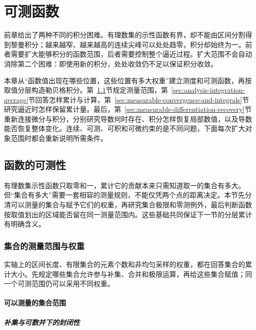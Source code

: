 \chapter{可测函数}
\label{chap:measurable-functions}

前章给出了两种不同的积分困难。有理数集的示性函数有界，却不能由区间分割得到黎曼积分；越来越窄、越来越高的连续尖峰可以处处趋零，积分却始终为一。前者需要扩大能够积分的函数范围，后者需要控制整个逼近过程。扩大范围不会自动消除第二个困难：即使用新的积分，处处收敛仍不足以保证积分收敛。

本章从“函数值出现在哪些位置，这些位置有多大权重”建立测度和可测函数，再按取值分层构造勒贝格积分。第~\ref{sec:analysis-set-structures}节规定测量范围，第~\ref{sec:analysis-integration-average}节回答怎样累计与计算，第~\ref{sec:measurable-convergence-and-integrals}节研究逼近时怎样保留累计量。最后，第~\ref{sec:measurable-differentiation-recovery}节重新连接微分与积分，分别研究导数何时存在、积分怎样恢复局部数值，以及导数能否恢复整体变化。连续、可测、可积和可微约束的是不同问题，下面每次扩大对象范围时都会重新说明所需条件。

\section{函数的可测性}
\label{sec:analysis-set-structures}

有理数集示性函数只取零和一，累计它的贡献本来只需知道取一的集合有多大。但“集合有多大”需要一套相容的测量规则，不能仅凭两个点的距离决定。本节先分清可以测量的集合与赋予它们的权重，再研究集合极限和零测例外，最后判断函数按取值划出的区域能否留在同一测量范围内。这些基础共同保证下一节的分层累计有明确含义。

\subsection{集合的测量范围与权重}

实轴上的区间长度、有限集合的元素个数和非均匀采样的权重，都在回答集合的累计大小。先规定哪些集合允许参与补集、合并和极限运算，再给这些集合赋值；同一个可测范围仍可以采用不同权重。

\subsubsection{可以测量的集合范围}
\paragraph{补集与可数并下的封闭性}

